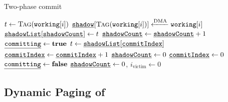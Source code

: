 
\begin{algorithm}[t]
	\caption{Two-phase commit}
	\label{algo:commit}
	\scriptsize
	\begin{algorithmic}[1]
         
                \State $t \gets \Call{Tag}{\texttt{working}[i]}$
                \State $\texttt{\underline{shadow}}[\Call{Tag}{\texttt{working}[i]}] \xleftarrow{\text{DMA}} \texttt{working}[i]$
                \State $\texttt{\underline{shadowList}}[\texttt{\underline{shadowCount}}] \gets t$
                \State $\texttt{\underline{shadowCount}} \gets \texttt{\underline{shadowCount}} + 1$
            \EndFor
            \State {}
        \EndProcedure
         
            \State $\texttt{\underline{committing}} \gets \textbf{true}$
                \State $t \gets \texttt{\underline{shadowList}}[\texttt{\underline{commitIndex}}]$
                \State {}
                \State $\texttt{\underline{commitIndex}} \gets \texttt{\underline{commitIndex}} + 1$
            \EndWhile
            \State $\texttt{\underline{shadowCount}} \gets 0$
            \State $\texttt{\underline{commitIndex}} \gets 0$
            \State $\texttt{\underline{committing}} \gets \textbf{false}$
        \EndProcedure
         
             
            \EndIf
            \State $\texttt{\underline{shadowCount}} \gets 0$, $i_\text{victim} \gets 0$
        \EndProcedure
	\end{algorithmic}
\end{algorithm}



\subsection{Dynamic Paging of \sys}


